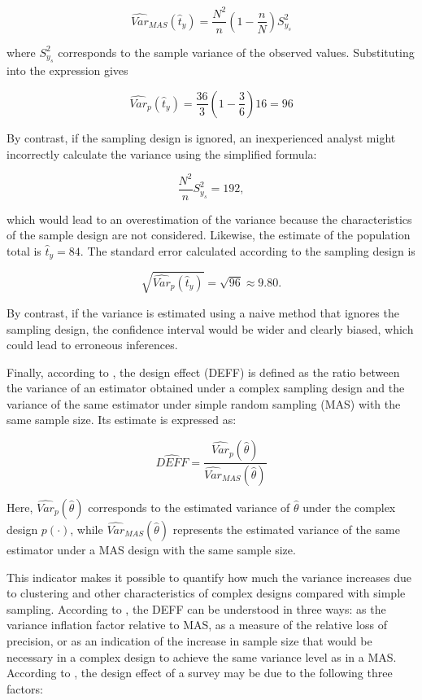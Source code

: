 \documentclass[
  english,
  12pt,
]{book}
\begin{document}
\[
\widehat{Var}_{MAS}(\hat{t}_{y}) = \frac{N^2}{n}\left(1-\frac{n}{N}\right)S_{y_s}^2
\]

where \(S_{y_s}^2\) corresponds to the sample variance of the observed values. Substituting into the expression gives

\[
\widehat{Var}_p(\hat{t}_{y}) = \frac{36}{3}\left(1-\frac{3}{6}\right)16 = 96
\]

By contrast, if the sampling design is ignored, an inexperienced analyst might incorrectly calculate the variance using the simplified formula:

\[
\frac{N^2}{n}S_{y_s}^2 = 192,
\]

which would lead to an overestimation of the variance because the characteristics of the sample design are not considered. Likewise, the estimate of the population total is \(\hat{t}_{y}=84\). The standard error calculated according to the sampling design is

\[
\sqrt{\widehat{Var}_p(\hat{t}_{y})} = \sqrt{96} \approx 9.80.
\]

By contrast, if the variance is estimated using a naive method that ignores the sampling design, the confidence interval would be wider and clearly biased, which could lead to erroneous inferences.

Finally, according to \citet[p.~258]{kish1965survey}, the design effect (DEFF) is defined as the ratio between the variance of an estimator obtained under a complex sampling design and the variance of the same estimator under simple random sampling (MAS) with the same sample size. Its estimate is expressed as:

\[
\widehat{{DEFF}} = \frac{\widehat{Var}_{p}(\hat{\theta})}{\widehat{Var}_{MAS}(\hat{\theta})}
\]

Here, \(\widehat{Var}_{p}(\hat{\theta})\) corresponds to the estimated variance of \(\hat{\theta}\) under the complex design \(p(\cdot)\), while \(\widehat{Var}_{MAS}(\hat{\theta})\)
represents the estimated variance of the same estimator under a MAS design with the same sample size.

This indicator makes it possible to quantify how much the variance increases due to clustering and other characteristics of complex designs compared with simple sampling. According to \citet[p.~40]{ONUDeff}, the DEFF can be understood in three ways: as the variance inflation factor relative to MAS, as a measure of the relative loss of precision, or as an indication of the increase in sample size that would be necessary in a complex design to achieve the same variance level as in a MAS. According to \citet{Park2003Design}, the design effect of a survey may be due to the following three factors:
\end{document}
